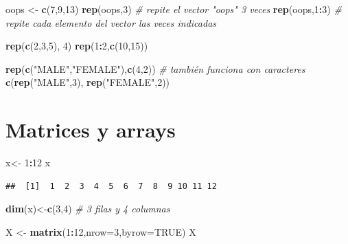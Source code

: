 \documentclass[]{book}
\newenvironment{Shaded}{\begin{snugshade}}{\end{snugshade}}
\newcommand{\KeywordTok}[1]{\textcolor[rgb]{0.13,0.29,0.53}{\textbf{#1}}}
\newcommand{\DataTypeTok}[1]{\textcolor[rgb]{0.13,0.29,0.53}{#1}}
\newcommand{\DecValTok}[1]{\textcolor[rgb]{0.00,0.00,0.81}{#1}}
\newcommand{\StringTok}[1]{\textcolor[rgb]{0.31,0.60,0.02}{#1}}
\newcommand{\CommentTok}[1]{\textcolor[rgb]{0.56,0.35,0.01}{\textit{#1}}}
\newcommand{\OtherTok}[1]{\textcolor[rgb]{0.56,0.35,0.01}{#1}}
\newcommand{\OperatorTok}[1]{\textcolor[rgb]{0.81,0.36,0.00}{\textbf{#1}}}
\newcommand{\NormalTok}[1]{#1}
\begin{document}
\begin{Shaded}
\begin{Highlighting}[]
\NormalTok{oops <-}\StringTok{ }\KeywordTok{c}\NormalTok{(}\DecValTok{7}\NormalTok{,}\DecValTok{9}\NormalTok{,}\DecValTok{13}\NormalTok{)}
\KeywordTok{rep}\NormalTok{(oops,}\DecValTok{3}\NormalTok{)   }\CommentTok{# repite el vector "oops" 3 veces}
\KeywordTok{rep}\NormalTok{(oops,}\DecValTok{1}\OperatorTok{:}\DecValTok{3}\NormalTok{) }\CommentTok{# repite cada elemento del vector las veces indicadas}

\KeywordTok{rep}\NormalTok{(}\KeywordTok{c}\NormalTok{(}\DecValTok{2}\NormalTok{,}\DecValTok{3}\NormalTok{,}\DecValTok{5}\NormalTok{), }\DecValTok{4}\NormalTok{)}
\KeywordTok{rep}\NormalTok{(}\DecValTok{1}\OperatorTok{:}\DecValTok{2}\NormalTok{,}\KeywordTok{c}\NormalTok{(}\DecValTok{10}\NormalTok{,}\DecValTok{15}\NormalTok{))}

\KeywordTok{rep}\NormalTok{(}\KeywordTok{c}\NormalTok{(}\StringTok{"MALE"}\NormalTok{,}\StringTok{"FEMALE"}\NormalTok{),}\KeywordTok{c}\NormalTok{(}\DecValTok{4}\NormalTok{,}\DecValTok{2}\NormalTok{)) }\CommentTok{# también funciona con caracteres}
\KeywordTok{c}\NormalTok{(}\KeywordTok{rep}\NormalTok{(}\StringTok{"MALE"}\NormalTok{,}\DecValTok{3}\NormalTok{), }\KeywordTok{rep}\NormalTok{(}\StringTok{"FEMALE"}\NormalTok{,}\DecValTok{2}\NormalTok{))}
\end{Highlighting}
\end{Shaded}

\section{Matrices y arrays}\label{matrices-y-arrays}

\begin{Shaded}
\begin{Highlighting}[]
\NormalTok{x<-}\StringTok{ }\DecValTok{1}\OperatorTok{:}\DecValTok{12}
\NormalTok{x}
\end{Highlighting}
\end{Shaded}

\begin{verbatim}
##  [1]  1  2  3  4  5  6  7  8  9 10 11 12
\end{verbatim}

\begin{Shaded}
\begin{Highlighting}[]
\KeywordTok{dim}\NormalTok{(x)<-}\KeywordTok{c}\NormalTok{(}\DecValTok{3}\NormalTok{,}\DecValTok{4}\NormalTok{)  }\CommentTok{# 3 filas y 4 columnas}

\NormalTok{X <-}\StringTok{ }\KeywordTok{matrix}\NormalTok{(}\DecValTok{1}\OperatorTok{:}\DecValTok{12}\NormalTok{,}\DataTypeTok{nrow=}\DecValTok{3}\NormalTok{,}\DataTypeTok{byrow=}\OtherTok{TRUE}\NormalTok{)}
\NormalTok{X}
\end{Highlighting}
\end{Shaded}
\end{document}
